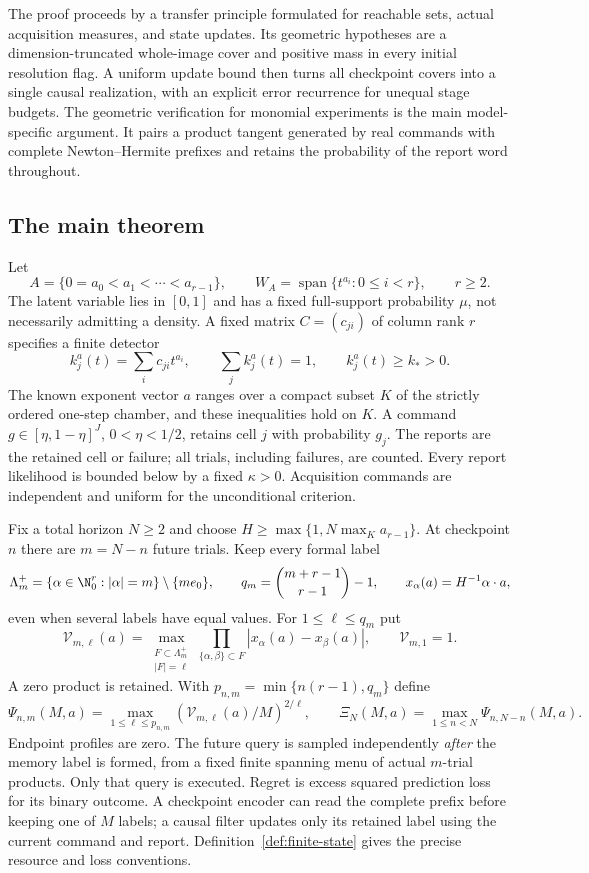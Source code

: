 \documentclass[11pt]{amsart}
\theoremstyle{definition}\newtheorem{definition}[theorem]{Definition}
\theoremstyle{remark}\newtheorem{remark}[theorem]{Remark}
\begin{document}
The proof proceeds by a transfer principle formulated for reachable
sets, actual acquisition measures, and state updates. Its geometric
hypotheses are a dimension-truncated whole-image cover and positive
mass in every initial resolution flag. A uniform update bound then
turns all checkpoint covers into a single causal realization, with an
explicit error recurrence for unequal stage budgets. The geometric
verification for monomial experiments is the main model-specific
argument. It pairs a product tangent generated by real commands with
complete Newton--Hermite prefixes and retains the probability of the
report word throughout.

\subsection{The main theorem}
Let
\[
 A=\{0=a_0<a_1<\cdots<a_{r-1}\},\qquad
 W_A=\operatorname{span}\{t^{a_i}:0\le i<r\},\qquad r\ge2.
\]
The latent variable lies in $[0,1]$ and has a fixed full-support
probability $\mu$, not necessarily admitting a density. A fixed matrix
$C=(c_{ji})$ of column rank $r$ specifies a finite detector
\[
 k_j^a(t)=\sum_i c_{ji}t^{a_i},\qquad
 \sum_j k_j^a(t)=1,\qquad k_j^a(t)\ge k_*>0.
\]
The known exponent vector $a$ ranges over a compact subset $K$ of the
strictly ordered one-step chamber, and these inequalities hold on $K$.
A command $g\in[\eta,1-\eta]^J$, $0<\eta<1/2$, retains cell $j$
with probability $g_j$. The reports are the retained cell or failure;
all trials, including failures, are counted. Every report likelihood is
bounded below by a fixed $\kappa>0$. Acquisition commands are independent
and uniform for the unconditional criterion.

Fix a total horizon $N\ge2$ and choose
$H\ge\max\{1,N\max_K a_{r-1}\}$. At checkpoint $n$ there are
$m=N-n$ future trials. Keep every formal label
\[
 \Lambda_m^+=\{\alpha\in\N_0^r:|\alpha|=m\}\setminus\{me_0\},
 \qquad q_m=\binom{m+r-1}{r-1}-1,
 \qquad x_\alpha(a)=H^{-1}\alpha\cdot a,
\]
even when several labels have equal values. For $1\le\ell\le q_m$ put
\[
 \mathcal V_{m,\ell}(a)=\max_{\substack{F\subset\Lambda_m^+\\|F|=\ell}}
     \prod_{\{\alpha,\beta\}\subset F}|x_\alpha(a)-x_\beta(a)|,
 \qquad \mathcal V_{m,1}=1.
\]
A zero product is retained. With $p_{n,m}=\min\{n(r-1),q_m\}$ define
\[
 \Psi_{n,m}(M,a)=\max_{1\le\ell\le p_{n,m}}
       (\mathcal V_{m,\ell}(a)/M)^{2/\ell},\qquad
 \Xi_N(M,a)=\max_{1\le n<N}\Psi_{n,N-n}(M,a).
\]
Endpoint profiles are zero. The future query is sampled independently
\emph{after} the memory label is formed, from a fixed finite spanning
menu of actual $m$-trial products. Only that query is executed. Regret
is excess squared prediction loss for its binary outcome. A checkpoint
encoder can read the complete prefix before keeping one of $M$ labels;
a causal filter updates only its retained label using the current
command and report. Definition~\ref{def:finite-state} gives the precise
resource and loss conventions.
\end{document}
